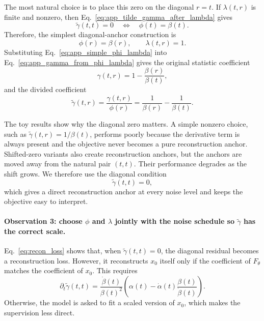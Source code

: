The most natural choice is to place this zero on the diagonal $r=t$. If $\lambda(t,r)$ is finite and nonzero, then Eq.~\eqref{eq:app_tilde_gamma_after_lambda} gives
\begin{equation}
\tilde{\gamma}(t,t)=0
\quad\Longleftrightarrow\quad
\phi(t)=\beta(t).
\label{eq:app_diagonal_phi_condition}
\end{equation}
Therefore, the simplest diagonal-anchor construction is
\begin{equation}
\phi(r)=\beta(r),
\qquad
\lambda(t,r)=1.
\label{eq:app_simple_phi_lambda}
\end{equation}
Substituting Eq.~\eqref{eq:app_simple_phi_lambda} into Eq.~\eqref{eq:app_gamma_from_phi_lambda} gives the original statistic coefficient
\begin{equation}
\gamma(t,r)
=
1-\frac{\beta(r)}{\beta(t)},
\label{eq:app_original_gamma_main}
\end{equation}
and the divided coefficient
\begin{equation}
\tilde{\gamma}(t,r)
=
\frac{\gamma(t,r)}{\phi(r)}
=
\frac{1}{\beta(r)}
-
\frac{1}{\beta(t)} .
\label{eq:gamma_inv}
\end{equation}

The toy results show why the diagonal zero matters. A simple nonzero choice, such as $\tilde{\gamma}(t,r)=1/\beta(t)$, performs poorly because the derivative term is always present and the objective never becomes a pure reconstruction anchor. Shifted-zero variants also create reconstruction anchors, but the anchors are moved away from the natural pair $(t,t)$. Their performance degrades as the shift grows. We therefore use the diagonal condition
\begin{equation}
\tilde{\gamma}(t,t)=0,
\label{eq:diagonal_zero_condition}
\end{equation}
which gives a direct reconstruction anchor at every noise level and keeps the objective easy to interpret.

\paragraph{Observation 3: choose $\phi$ and $\lambda$ jointly with the noise schedule so $\tilde{\gamma}$ has the correct scale.}
Eq.~\eqref{eq:recon_loss} shows that, when $\tilde{\gamma}(t,t)=0$, the diagonal residual becomes a reconstruction loss. However, it reconstructs $x_0$ itself only if the coefficient of $F_\theta$ matches the coefficient of $x_0$. This requires
\begin{equation}
\partial_t\tilde{\gamma}(t,t)
=
\frac{\dot\beta(t)}{\beta(t)^2}
\left(
\alpha(t)-\dot\alpha(t)\frac{\beta(t)}{\dot\beta(t)}
\right).
\label{eq:diagonal_scale_condition}
\end{equation}
Otherwise, the model is asked to fit a scaled version of $x_0$, which makes the supervision less direct.

